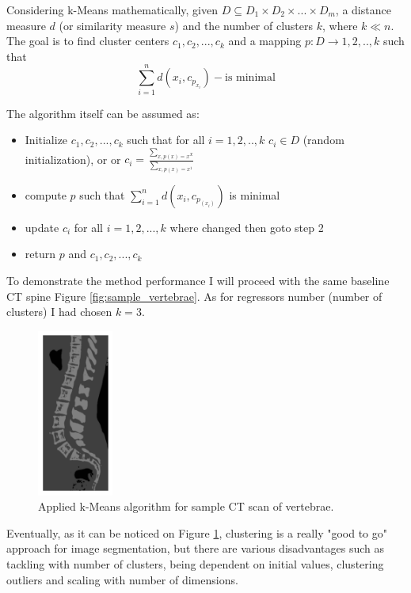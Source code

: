 Considering k-Means mathematically, given $D \subseteq D_1 \times D_2 \times ... \times D_m$, a distance measure $d$ (or similarity measure $s$) and the number of clusters $k$, where $k \ll n$. The goal is to find cluster centers $c_1, c_2, ..., c_k$ and a mapping $p: D \rightarrow {1, 2, .., k} $ such that \[ \sum_{i=1}^{n} d(x_i, c_p_{x_i}) - \text{is minimal}\]

The algorithm itself can be assumed as:
\begin{itemize}
    \item Initialize $c_1, c_2, ..., c_k$ such that for all $i = {1, 2, .., k}$
    \subitem $c_i \in D$ (random initialization), or
    \subitem or $c_i = \frac{\sum_{x, p(x) = x^X}}{\sum_{x, p(x) = x^1}}$
    \item compute $p$ such that
    \subitem $\sum_{i=1}^n d(x_i, c_p_{(x_i)})$ is minimal
    \item update $c_i$ for all $i = {1,2, ..., k}$ where changed then goto step 2
    \item return $p$ and $c_1, c_2, ..., c_k$
\end{itemize}
    

To demonstrate the method performance I will proceed with the same baseline CT spine Figure \ref{fig:sample_vertebrae}. As for regressors number (number of clusters) I had chosen $k=3$.  

\begin{figure}[h]
    \centering \includegraphics[width=2.5cm]{images/sample_vertebrae_kmeans.png}
    \caption {Applied k-Means algorithm for sample CT scan of vertebrae.}
    \label{fig:k_menas}
\end{figure}

Eventually, as it can be noticed on Figure \ref{fig:k_menas}, clustering is a really "good to go" approach for image segmentation, but there are various disadvantages such as tackling with number of clusters, being dependent on initial values, clustering outliers and scaling with number of dimensions.

